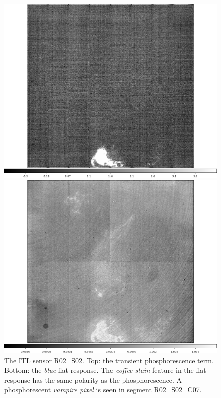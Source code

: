 \begin{figure}[!htbp]
\centering
\begin{minipage}{1.0\textwidth}    
  \centering
  \includegraphics[width=.6\linewidth]{figures/phosphorescence-survey/stains_phos_R02_S02.png}    
\end{minipage}
\begin{minipage}{1.0\textwidth}
  \centering
  \includegraphics[width=.6\linewidth]{figures/phosphorescence-survey/stains_abs_R02_S02.png}
\end{minipage}
\caption{The ITL sensor R02\_S02. Top: the transient phosphorescence term. Bottom: the {\it blue} flat response. The {\it coffee stain} feature in the flat response has the same polarity as the phosphorescence. A phosphorescent {\it vampire pixel} is seen in segment R02\_S02\_C07.}
\label{fig:phos:stains:R02S02}
\end{figure}

